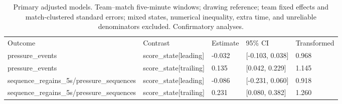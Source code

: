 \begin{table}[ht]
\centering
\small
\caption{Primary adjusted models. Team--match five-minute windows; drawing reference; team fixed effects and match-clustered standard errors; mixed states, numerical inequality, extra time, and unreliable denominators excluded. Confirmatory analyses.}
\begin{tabular}{lllll}
\hline
Outcome & Contrast & Estimate & 95\% CI & Transformed \\
pressure\_events & score\_state[leading] & -0.032 & [-0.103, 0.038] & 0.968 \\
pressure\_events & score\_state[trailing] & 0.135 & [0.042, 0.229] & 1.145 \\
sequence\_regains\_5s/pressure\_sequences & score\_state[leading] & -0.086 & [-0.231, 0.060] & 0.918 \\
sequence\_regains\_5s/pressure\_sequences & score\_state[trailing] & 0.231 & [0.080, 0.382] & 1.260 \\
\hline
\end{tabular}
\end{table}
